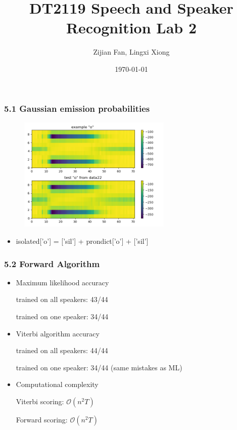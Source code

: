 \documentclass[t]{beamer}
\title
	{DT2119 Speech and Speaker Recognition Lab 2
	}
\author[Zifan, Lingxi]
	{
	Zijian Fan, Lingxi Xiong
	}
\institute{}
\date{}
\date{\today}
\begin{document}
	
\begin{frame}
	\titlepage
\end{frame}
	
\begin{frame}
	\frametitle{5.1 Gaussian emission probabilities}
	\begin{figure}
\centering
		\includegraphics[width=0.65\textwidth]{figures/51.png}
	\end{figure}
			
	\begin{itemize}
		\item  isolated['o'] = ['sil'] + prondict['o'] + ['sil']
	\end{itemize}
\end{frame}
	
\begin{frame}
	\frametitle{5.2 Forward Algorithm}
	\begin{itemize}
		\item Maximum likelihood accuracy
		
trained on all speakers: 43/44

trained on one speaker: 34/44\\


		\item Viterbi algorithm accuracy

trained on all speakers: 44/44

trained on one speaker: 34/44 (same mistakes as ML)\\


		\item Computational complexity

Viterbi scoring: $\mathcal{O}(n^2T)$ 

Forward scoring: $\mathcal{O}(n^2T)$\\

	\end{itemize}
\end{frame}
	
\end{document}
